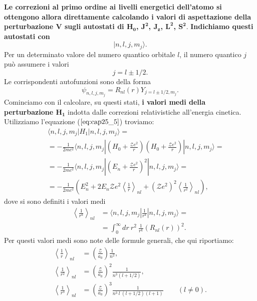 \textbf{Le correzioni al primo ordine ai livelli energetici dell'atomo si ottengono allora direttamente calcolando i valori di aspettazione della perturbazione $\boldsymbol{V}$ sugli autostati di $\boldsymbol{H_0}$, $\boldsymbol{J^2}$, $\boldsymbol{J_z}$, $\boldsymbol{L^2}$, $\boldsymbol{S^2}$}. \textbf{Indichiamo questi autostati con}
\begin{equation} 
| n,l,j,m_j \rangle .
\end{equation}
Per un determinato valore del numero quantico orbitale $l$, il numero quantico $j$ può assumere i valori
\begin{equation} 
j=l\pm1/2 .
\end{equation}
Le corrispondenti autofunzioni sono della forma
\begin{equation} 
\psi_{n,l,j,m_j}=R_{nl}(r)Y_{j=l\pm1/2,m_j} .
\end{equation}
Cominciamo con il calcolare, su questi stati, \textbf{i valori medi della perturbazione $\boldsymbol{H_1}$} indotta dalle correzioni relativistiche all'energia cinetica. Utilizziamo l'equazione ($\ref{eq:cap25_5}$) troviamo:
\begin{eqnarray} \label{eq:cap25_7} 
& &\langle n,l,j,m_j | H_1 |n,l,j,m_j \rangle = \nonumber \\
& &=-\frac{1}{2mc^2}\langle n,l,j,m_j |\left( H_0+\frac{\mathcal{Z}e^2}{r} \right) \left( H_0+\frac{\mathcal{Z}e^2}{r} \right)  |n,l,j,m_j \rangle = \nonumber \\
& &=-\frac{1}{2mc^2}\langle n,l,j,m_j | \left( E_n+\frac{\mathcal{Z}e^2}{r} \right)^2  | n,l,j,m_j\rangle = \nonumber \\
& &=-\frac{1}{2mc^2} \left( E_n^2+2E_n\mathcal{Z}e^2 \left< \frac{1}{r} \right>_{nl} +\left( \mathcal{Z}e^2 \right)^2\left< \frac{1}{r^2} \right>_{nl} \right)  ,
\end{eqnarray}
dove si sono definiti i valori medi
\begin{eqnarray} 
\left< \frac{1}{r^k} \right>_{nl} & = \langle n,l,j,m_j | \frac{1}{r^k} | n,l,j,m_j \rangle = \nonumber\\
& = \int_0^{\infty} dr \ r^2 \ \frac{1}{r^k} \left( R_{nl}(r) \right)^2 .
\end{eqnarray}
Per questi valori medi sono note delle formule generali, che qui riportiamo:
\begin{equation} \label{eq:cap25_8}
\begin{split}
\left< \frac{1}{r} \right>_{nl} & = \left( \frac{\mathcal{Z}}{a_0} \right) \frac{1}{n^2} , \\ 
\left< \frac{1}{r^2} \right>_{nl} & = \left( \frac{\mathcal{Z}}{a_0} \right)^2 \frac{1}{n^3(l+1/2)}  ,\\ 
\left< \frac{1}{r^3} \right>_{nl} &= \left( \frac{\mathcal{Z}}{a_0} \right)^3 \frac{1}{n^3 \ l \ (l+1/2)(l+1)} \qquad (l \neq0) .
\end{split}
\end{equation}
